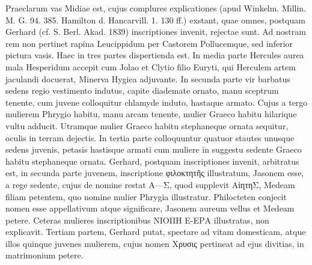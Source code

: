 \documentclass[a4paper, 11pt, oneside, polutonikogreek, german]{article}
\begin{document}
Praeclarum vas Midiae est, cujus complures explicationes (apud Winkelm. Millin. M. G. 94. 385. Hamilton d. Hancarvill. 1. 130 ff.) exstant, quae omnes, postquam Gerhard (cf. S. Berl. Akad. 1839) inscriptiones invenit, rejectae sunt. Ad nostram rem non pertinet rapina Leucippidum per Castorem Pollucemque, sed inferior pictura vasis. Haec in tres partes dispertienda est. In media parte Hercules aurea mala Hesperidum accepit cum Jolao et Clytio filio Euryti, qui Herculem artem jaculandi docuerat, Minerva Hygiea adjuvante. In secunda parte vir barbatus sedens regio vestimento indutus, capite diademate ornato, manu sceptrum tenente, cum juvene colloquitur chlamyde induto, hastaque armato. Cujus a tergo mulierem Phrygio habitu, manu arcam tenente, mulier Graeco habitu hilarique vultu adducit. Utramque mulier Graeco habitu stephaneque ornata sequitur, oculis in terram dejectis. In tertia parte colloquuntur quatuor stautes unusque sedens juvenis, petasis hastisque armati cum muliere in suggestu sedente Graeco habitu stephaneque ornata. Gerhard, postquam inscriptiones invenit, arbitratus est, in secunda parte juvenem, inscriptione φιλοκτητῆς illustratum, Jasonem esse, a rege sedente, cujus de nomine restat Α---Σ, quod supplevit ΑἰητηΣ, Medeam filiam petentem, quo nomine mulier Phrygia illustratur. Philocteten conjecit nomen esse appellativum atque significare, Jasonem aureum vellus et Medeam petere. Ceteras mulieres inscriptionibus ΝΙΟΠΗ Ε-ΕΡΑ illustratas, non explicavit. Tertiam partem, Gerhard putat, spectare ad vitam domesticam, atque illos quinque juvenes mulierem, cujus nomen Χρυσις pertineat ad ejus divitias, in matrimonium petere.
\end{document}
